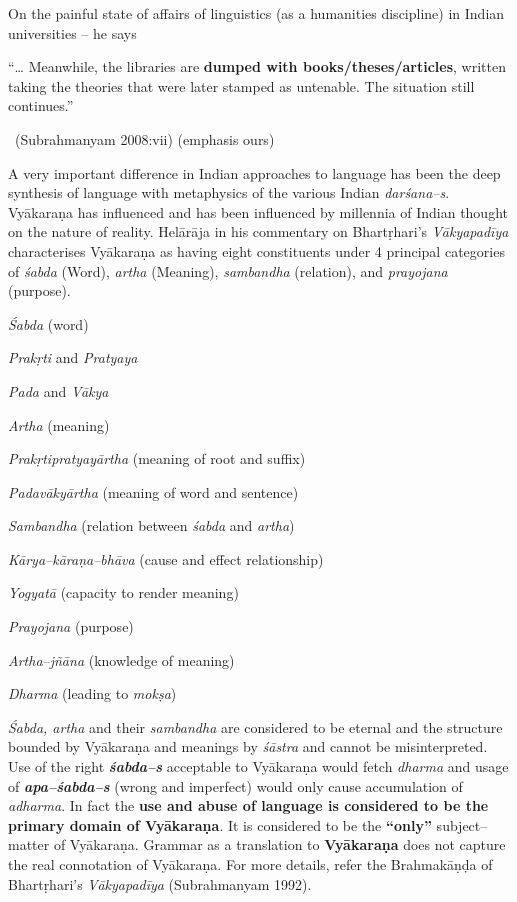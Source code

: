 On the painful state of affairs of linguistics (as a humanities discipline) in Indian universities – he says

\begin{myquote}
“… Meanwhile, the libraries are \textbf{dumped with books/theses/articles}, written taking the theories that were later stamped as untenable. The situation still continues.” 

~\hfill (Subrahmanyam 2008:vii) (emphasis ours)
\end{myquote}

A very important difference in Indian approaches to language has been the deep synthesis of language with metaphysics of the various Indian \textit{darśana–s}. Vyākaraṇa has influenced and has been influenced by millennia of Indian thought on the nature of reality. Helārāja in his commentary on Bhartṛhari’s \textit{Vākyapadīya} characterises Vyākaraṇa as having eight constituents under 4 principal categories of \textit{śabda} (Word), \textit{artha} (Meaning), \textit{sambandha} (relation), and \textit{prayojana} (purpose).

\item \textit{Śabda} (word)
 \item \textit{Prakṛti} and \textit{Pratyaya}

 \item \textit{Pada} and \textit{Vākya}


 \item \textit{Artha} (meaning)
 \item \textit{Prakṛtipratyayārtha} (meaning of root and suffix)

 \item \textit{Padavākyārtha} (meaning of word and sentence)


 \item \textit{Sambandha} (relation between \textit{śabda} and \textit{artha})
 \item \textit{Kārya–kāraṇa–bhāva} (cause and effect relationship)

 \item \textit{Yogyatā} (capacity to render meaning)


 \item \textit{Prayojana} (purpose)
 \item \textit{Artha–jñāna} (knowledge of meaning)

 \item \textit{Dharma} (leading to \textit{mokṣa})



\textit{Śabda, artha} and their \textit{sambandha} are considered to be eternal and the structure bounded by Vyākaraṇa and meanings by \textit{śāstra} and cannot be misinterpreted. Use of the right \textbf{\textit{śabda–s}} acceptable to Vyākaraṇa would fetch \textit{dharma} and usage of \textbf{\textit{apa–śabda–s}} (wrong and imperfect) would only cause accumulation of \textit{adharma}. In fact the \textbf{use and abuse of language is considered to be the primary domain of Vyākaraṇa}. It is considered to be the \textbf{“only”} subject–matter of Vyākaraṇa. Grammar as a translation to \textbf{Vyākaraṇa} does not capture the real connotation of Vyākaraṇa. For more details, refer the Brahmakāṇḍa of Bhartṛhari’s \textit{Vākyapadīya} (Subrahmanyam 1992).


